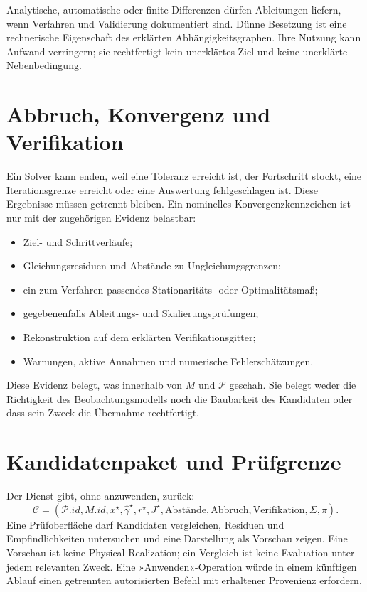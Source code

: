 Analytische, automatische oder finite Differenzen dürfen Ableitungen liefern,
wenn Verfahren und Validierung dokumentiert sind. Dünne Besetzung ist eine
rechnerische Eigenschaft des erklärten Abhängigkeitsgraphen. Ihre Nutzung kann
Aufwand verringern; sie rechtfertigt kein unerklärtes Ziel und keine
unerklärte Nebenbedingung.

\section{Abbruch, Konvergenz und Verifikation}

Ein Solver kann enden, weil eine Toleranz erreicht ist, der Fortschritt
stockt, eine Iterationsgrenze erreicht oder eine Auswertung fehlgeschlagen ist.
Diese Ergebnisse müssen getrennt bleiben. Ein nominelles
Konvergenzkennzeichen ist nur mit der zugehörigen Evidenz belastbar:
\begin{itemize}
\item Ziel- und Schrittverläufe;
\item Gleichungsresiduen und Abstände zu Ungleichungsgrenzen;
\item ein zum Verfahren passendes Stationaritäts- oder Optimalitätsmaß;
\item gegebenenfalls Ableitungs- und Skalierungsprüfungen;
\item Rekonstruktion auf dem erklärten Verifikationsgitter;
\item Warnungen, aktive Annahmen und numerische Fehlerschätzungen.
\end{itemize}

Diese Evidenz belegt, was innerhalb von \(M\) und \(\mathcal P\) geschah. Sie
belegt weder die Richtigkeit des Beobachtungsmodells noch die Baubarkeit des
Kandidaten oder dass sein Zweck die Übernahme rechtfertigt.

\section{Kandidatenpaket und Prüfgrenze}

Der Dienst gibt, ohne anzuwenden, zurück:
\[
\mathcal C=
(\mathcal P.id,M.id,x^\star,\widehat\gamma^\star,
r^\star,J^\star,\text{Abstände},\text{Abbruch},
\text{Verifikation},\Sigma,\pi).
\]
Eine Prüfoberfläche darf Kandidaten vergleichen, Residuen und
Empfindlichkeiten untersuchen und eine Darstellung als Vorschau zeigen. Eine
Vorschau ist keine Physical Realization; ein Vergleich ist keine Evaluation
unter jedem relevanten Zweck. Eine »Anwenden«-Operation würde in einem
künftigen Ablauf einen getrennten autorisierten Befehl mit erhaltener
Provenienz erfordern.

